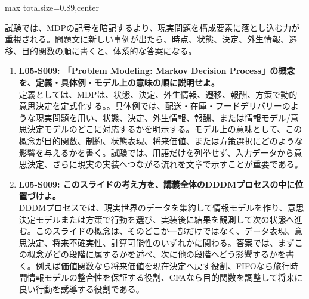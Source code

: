 \begin{minipage}[t]{0.58\textwidth}
\begin{adjustbox}{max totalsize={\textwidth}{0.89\textheight},center}
\begin{minipage}{\textwidth}
試験では、MDPの記号を暗記するより、現実問題を構成要素に落とし込む力が重視される。問題文に新しい事例が出たら、時点、状態、決定、外生情報、遷移、目的関数の順に書くと、体系的な答案になる。\par{}\begin{enumerate}\item \textbf{L05-S009: 「Problem Modeling: Markov Decision Process」の概念を、定義・具体例・モデル上の意味の順に説明せよ。}\\定義としては、MDPは、状態、決定、外生情報、遷移、報酬、方策で動的意思決定を定式化する。。具体例では、配送・在庫・フードデリバリーのような現実問題を用い、状態、決定、外生情報、報酬、または情報モデル/意思決定モデルのどこに対応するかを明示する。モデル上の意味として、この概念が目的関数、制約、状態表現、将来価値、または方策選択にどのような影響を与えるかを書く。試験では、用語だけを列挙せず、入力データから意思決定、さらに現実の実装へつながる流れを文章で示すことが重要である。\item \textbf{L05-S009: このスライドの考え方を、講義全体のDDDMプロセスの中に位置づけよ。}\\DDDMプロセスでは、現実世界のデータを集約して情報モデルを作り、意思決定モデルまたは方策で行動を選び、実装後に結果を観測して次の状態へ進む。このスライドの概念は、そのどこか一部だけではなく、データ表現、意思決定、将来不確実性、計算可能性のいずれかに関わる。答案では、まずこの概念がどの段階に属するかを述べ、次に他の段階へどう影響するかを書く。例えば価値関数なら将来価値を現在決定へ戻す役割、FIFOなら旅行時間情報モデルの整合性を保証する役割、CFAなら目的関数を調整して将来に良い行動を誘導する役割である。\end{enumerate}
\end{minipage}
\end{adjustbox}
\end{minipage}


